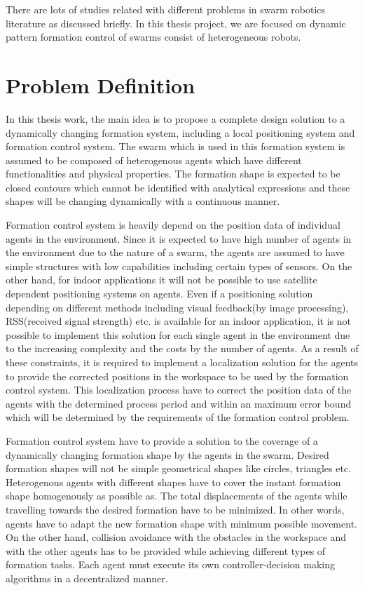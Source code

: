 There are lots of studies related with different problems in swarm robotics literature as discussed briefly. In this thesis project, we are focused on dynamic pattern formation control of swarms consist of heterogeneous robots.


\section{Problem Definition}
In this thesis work, the main idea is to propose a complete design solution to a dynamically changing formation system, including a local positioning system and formation control system. The swarm which is used in this formation system is assumed to be composed of heterogenous agents which have different functionalities and physical properties. The formation shape is expected to be closed contours which cannot be identified with analytical expressions and these shapes will be changing dynamically with a continuous manner. 

Formation control system is heavily depend on the position data of individual agents in the environment. Since it is expected to have high number of agents in the environment due to the nature of a swarm, the agents are assumed to have simple structures with low capabilities including certain types of sensors. On the other hand, for indoor applications it will not be possible to use satellite dependent positioning systems on agents. Even if a positioning solution depending on different methods including visual feedback(by image processing), RSS(received signal strength) etc. is available for an indoor application, it is not possible to implement this solution for each single agent in the environment due to the increasing complexity and the costs by the number of agents. As a result of these constraints, it is required to implement a localization solution for the agents to provide the corrected positions in the workspace to be used by the formation control system. This localization process have to correct the position data of the agents with the determined process period and within an maximum error bound which will be determined by the requirements of the formation control problem. 

Formation control system have to provide a solution to the coverage of a dynamically changing formation shape by the agents in the swarm. Desired formation shapes will not be simple geometrical shapes like circles, triangles etc.  Heterogenous agents with different shapes have to cover the instant formation shape homogenously as possible as. The total displacements of the agents while travelling towards the desired formation have to be minimized. In other words, agents have to adapt the new formation shape with minimum possible movement. On the other hand, collision avoidance with the obstacles in the workspace and with the other agents has to be provided while achieving different types of formation tasks. Each agent must execute its own controller-decision making algorithms in a decentralized manner. 
